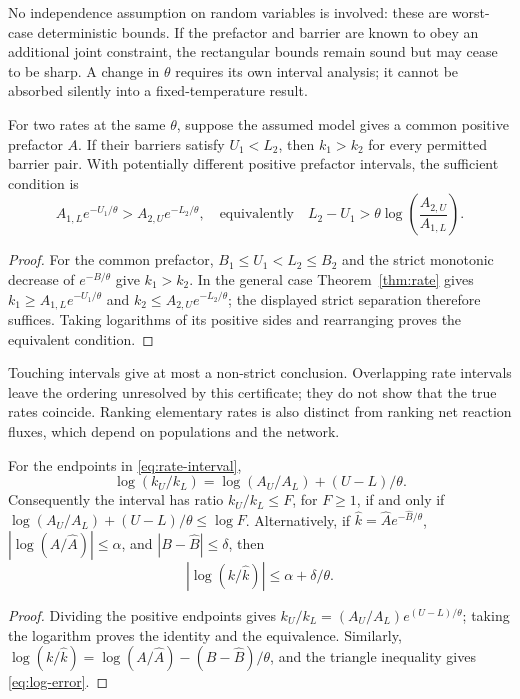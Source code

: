 No independence assumption on random variables is involved: these are
worst-case deterministic bounds. If the prefactor and barrier are known to
obey an additional joint constraint, the rectangular bounds remain sound
but may cease to be sharp. A change in $\theta$ requires its own interval
analysis; it cannot be absorbed silently into a fixed-temperature result.

\begin{corollary}
\label{cor:ranking}
For two rates at the same $\theta$, suppose the assumed model gives a common
positive prefactor $A$. If their barriers satisfy $U_1<L_2$, then
$k_1>k_2$ for every permitted barrier pair. With potentially different
positive prefactor intervals, the sufficient condition is
\begin{equation}
 A_{1,L}e^{-U_1/\theta}>A_{2,U}e^{-L_2/\theta},
 \quad\text{equivalently}\quad
 L_2-U_1>\theta\log\!\left(\frac{A_{2,U}}{A_{1,L}}\right).
 \label{eq:robust-ranking}
\end{equation}
\end{corollary}
\begin{proof}
For the common prefactor, $B_1\le U_1<L_2\le B_2$ and the strict
monotonic decrease of $e^{-B/\theta}$ give $k_1>k_2$.
In the general case Theorem~\ref{thm:rate} gives
$k_1\ge A_{1,L}e^{-U_1/\theta}$ and
$k_2\le A_{2,U}e^{-L_2/\theta}$; the displayed strict separation
therefore suffices. Taking logarithms of its positive sides and rearranging
proves the equivalent condition.
\end{proof}

Touching intervals give at most a non-strict conclusion. Overlapping rate
intervals leave the ordering unresolved by this certificate; they do not
show that the true rates coincide. Ranking elementary rates is also distinct
from ranking net reaction fluxes, which depend on populations and the network.

\begin{proposition}
\label{prop:log-budget}
For the endpoints in \eqref{eq:rate-interval},
\begin{equation}
 \log(k_U/k_L)=\log(A_U/A_L)+(U-L)/\theta.
 \label{eq:log-width}
\end{equation}
Consequently the interval has ratio $k_U/k_L\le F$, for $F\ge1$, if and
only if
$\log(A_U/A_L)+(U-L)/\theta\le\log F$.
Alternatively, if $\widehat k=\widehat A e^{-\widehat B/\theta}$,
$|\log(A/\widehat A)|\le\alpha$, and
$|B-\widehat B|\le\delta$, then
\begin{equation}
 |\log(k/\widehat k)|\le\alpha+\delta/\theta.
 \label{eq:log-error}
\end{equation}
\end{proposition}
\begin{proof}
Dividing the positive endpoints gives
$k_U/k_L=(A_U/A_L)e^{(U-L)/\theta}$; taking the logarithm proves the
identity and the equivalence. Similarly,
$\log(k/\widehat k)=\log(A/\widehat A)-(B-\widehat B)/\theta$,
and the triangle inequality gives \eqref{eq:log-error}.
\end{proof}

